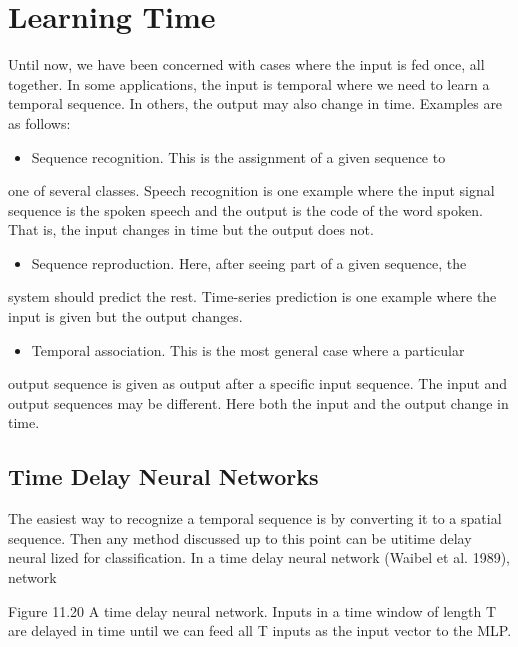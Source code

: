 \section{Learning Time}

Until now, we have been concerned with cases where the input is fed once, all together. In some applications, the input is temporal where we need to learn a temporal sequence. In others, the output may also change in time. Examples are as follows:

\begin{itemize}
\item Sequence recognition. This is the assignment of a given sequence to
\end{itemize}

one of several classes. Speech recognition is one example where the input signal sequence is the spoken speech and the output is the code of the word spoken. That is, the input changes in time but the output does not.

\begin{itemize}
\item Sequence reproduction. Here, after seeing part of a given sequence, the
\end{itemize}

system should predict the rest. Time-series prediction is one example where the input is given but the output changes.

\begin{itemize}
\item Temporal association. This is the most general case where a particular
\end{itemize}

output sequence is given as output after a specific input sequence. The input and output sequences may be different. Here both the input and the output change in time.

\subsection{Time Delay Neural Networks}

The easiest way to recognize a temporal sequence is by converting it to a spatial sequence. Then any method discussed up to this point can be utitime delay neural lized for classification. In a time delay neural network (Waibel et al. 1989), network

Figure 11.20 A time delay neural network. Inputs in a time window of length T are delayed in time until we can feed all T inputs as the input vector to the MLP.

